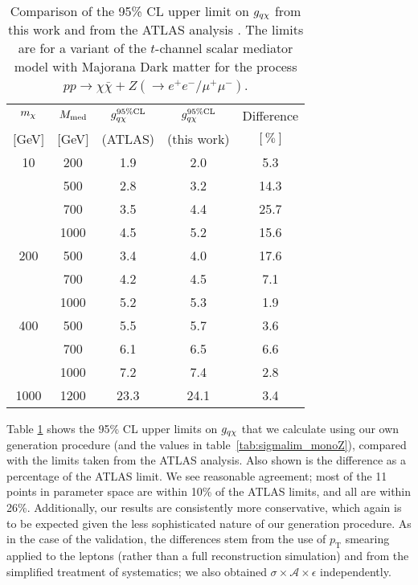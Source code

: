 \begin{table}
\begin{center}
\begin{tabular}{ c | c | c | c | c }
\hline
\hline
$m_{\chi}$ & $M_{\mathrm{med}}$ & $g_{q \chi}^{95\%\mathrm{CL}}$ & $g_{q \chi}^{95\%\mathrm{CL}}$ & Difference \T \\
$[$GeV$]$ & $[$GeV$]$ & (ATLAS) & (this work) & $[\%]$ \B \\
\hline
10 & 200 & 1.9 & 2.0 & 5.3 \T \\
 & 500 & 2.8 & 3.2 & 14.3 \\
 & 700 & 3.5 & 4.4 & 25.7 \\
 & 1000 & 4.5 & 5.2 & 15.6 \\
200 & 500 & 3.4 & 4.0 & 17.6 \T \\
 & 700 & 4.2 & 4.5 & 7.1 \\
 & 1000 & 5.2 & 5.3 & 1.9 \\
400 & 500 & 5.5 & 5.7 & 3.6 \T \\
 & 700 & 6.1 & 6.5 & 6.6 \\
 & 1000 & 7.2 & 7.4 & 2.8 \\
1000 & 1200 & 23.3 & 24.1 & 3.4 \T \B \\
\hline
\hline
\end{tabular}
\end{center}
\caption{Comparison of the 95\% CL upper limit on $g_{q \chi}$ from this work and from the ATLAS \monoZ analysis \cite{Aad:2014monoZlep}. The limits are for a variant of the $t$-channel scalar mediator model with Majorana Dark matter for the process $pp \rightarrow \chi \bar{\chi} + Z (\rightarrow e^{+}e^{-}/\mu^{+}\mu^{-})$.}
\label{tab:monoZvalidation}
\end{table}

Table \ref{tab:monoZvalidation} shows the 95\% CL upper limits on $g_{q \chi}$ that we calculate using our own generation procedure (and the values in table~\ref{tab:sigmalim_monoZ}), compared with the limits taken from the ATLAS analysis. Also shown is the difference as a percentage of the ATLAS limit. We see reasonable agreement; most of the 11 points in parameter space are within 10\% of the ATLAS limits, and all are within 26\%. Additionally, our results are consistently more conservative, which again is to be expected given the less sophisticated nature of our generation procedure. As in the case of the \monojet validation, the differences stem from the use of $p_{\mathrm{T}}$ smearing applied to the leptons (rather than a full reconstruction simulation) and from the simplified treatment of systematics; we also obtained $\sigma \times \mathcal{A} \times \epsilon$ independently.

